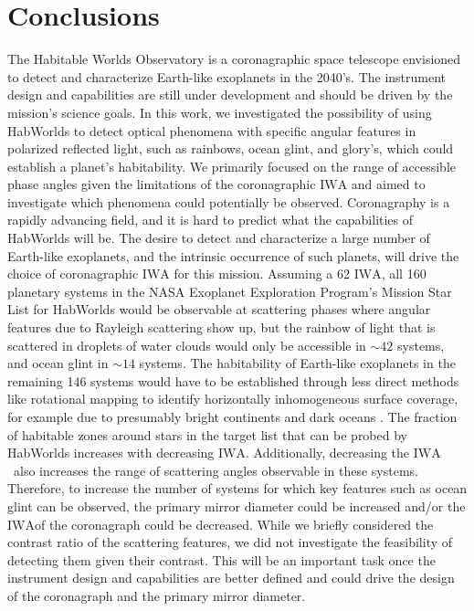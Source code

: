 \documentclass[
    usenatbib,
]{mnras}
\newcommand{\IWA}{\ensuremath{\mathrm{IWA}}}
\newcommand{\hwo}{HabWorlds}
\begin{document}

\section{Conclusions}
\label{sec:4}


The Habitable Worlds Observatory is a coronagraphic space telescope 
envisioned to detect and characterize Earth-like exoplanets in the 2040's. 
%
The instrument design and capabilities are still under development and 
should be driven by the mission's science goals.
%
In this work, we investigated the possibility of using \hwo{} to detect optical phenomena with specific angular features in polarized reflected light, such as rainbows, ocean glint, and glory's, which could establish a planet's habitability. 
%
We primarily focused on the range of accessible phase angles given the limitations of the coronagraphic \IWA{} and aimed to investigate which phenomena could potentially be observed.
%
Coronagraphy is a rapidly advancing field, and it is hard to predict what the capabilities of \hwo{} will be.
%
The desire to detect and characterize a large number of Earth-like exoplanets, and the intrinsic occurrence of such planets, will drive the choice of coronagraphic \IWA{} for this mission.
%
Assuming a \qty{62}{\mas} \IWA{}, all \num{160} planetary systems in the NASA Exoplanet Exploration Program's Mission Star List for \hwo{} would be observable at scattering phases where angular features due to Rayleigh scattering show up, but the rainbow of light that is scattered in droplets of water clouds would only be accessible in $\sim\num{42}$ systems, and ocean glint in $\sim\num{14}$ systems.
%
The habitability of Earth-like exoplanets in the remaining 146 systems would have to be established through less direct methods like rotational mapping to identify horizontally inhomogeneous surface coverage, for example due to presumably bright continents and dark oceans \citep[e.g.,][]{2009ApJ...700..915C,lustig2019}.   
%
The fraction of habitable zones around stars in the target list that can be probed by \hwo{} increases with decreasing \IWA{}. 
%
Additionally, decreasing the \IWA\ also increases the range of scattering angles observable in these systems. 
%
Therefore, to increase the number of systems for which key features such as ocean glint can be observed, the primary mirror diameter could be increased and/or the \IWA of the coronagraph could be decreased.
%
While we briefly considered the contrast ratio of the scattering features, we did not investigate the feasibility of detecting them given their contrast. 
%
This will be an important task once the instrument design and capabilities are better defined and could drive the design of the coronagraph and the primary mirror diameter. 
\end{document}
